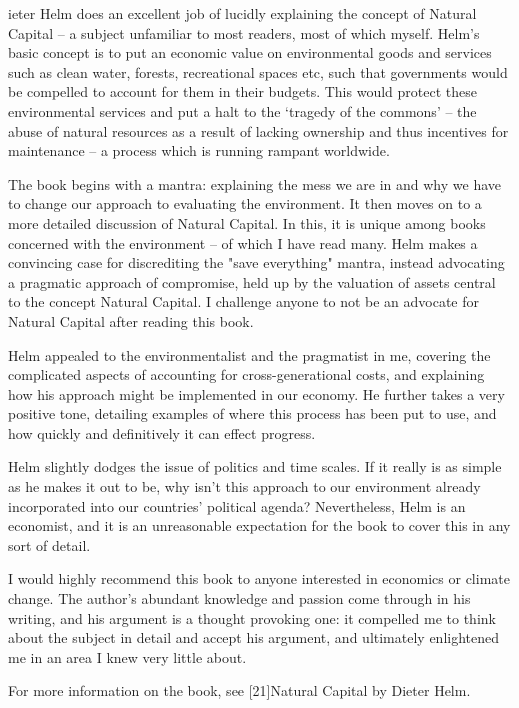 \label{ch:natural-capital}

   ieter Helm does an excellent job of lucidly explaining the concept of
   Natural Capital -- a subject unfamiliar to most readers, most of which
   myself. Helm's basic concept is to put an economic value on
   environmental goods and services such as clean water, forests,
   recreational spaces etc, such that governments would be compelled to
   account for them in their budgets. This would protect these
   environmental services and put a halt to the `tragedy of the commons'
   -- the abuse of natural resources as a result of lacking ownership and
   thus incentives for maintenance -- a process which is running rampant
   worldwide.

   The book begins with a mantra: explaining the mess we are in and why we
   have to change our approach to evaluating the environment. It then
   moves on to a more detailed discussion of Natural Capital. In this, it
   is unique among books concerned with the environment -- of which I have
   read many. Helm makes a convincing case for discrediting the "save
   everything" mantra, instead advocating a pragmatic approach of
   compromise, held up by the valuation of assets central to the concept
   Natural Capital. I challenge anyone to not be an advocate for Natural
   Capital after reading this book.

   Helm appealed to the environmentalist and the pragmatist in me,
   covering the complicated aspects of accounting for cross-generational
   costs, and explaining how his approach might be implemented in our
   economy. He further takes a very positive tone, detailing examples of
   where this process has been put to use, and how quickly and
   definitively it can effect progress.

   Helm slightly dodges the issue of politics and time scales. If it
   really is as simple as he makes it out to be, why isn't this approach
   to our environment already incorporated into our countries' political
   agenda? Nevertheless, Helm is an economist, and it is an unreasonable
   expectation for the book to cover this in any sort of detail.

   I would highly recommend this book to anyone interested in economics or
   climate change. The author's abundant knowledge and passion come
   through in his writing, and his argument is a thought provoking one: it
   compelled me to think about the subject in detail and accept his
   argument, and ultimately enlightened me in an area I knew very little
   about.

   For more information on the book, see [21]Natural Capital by Dieter
   Helm.

